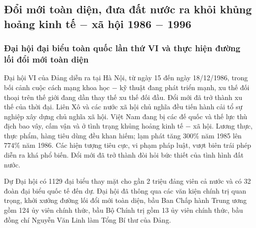 \subsection{Đổi mới toàn diện, đưa đất nước ra khỏi khủng hoảng kinh tế $-$ xã hội 1986 $-$ 1996}
\subsubsection{Đại hội đại biểu toàn quốc lần thứ VI và thực hiện đường lối đổi mới toàn diện}
Đại hội VI của Đảng diễn ra tại Hà Nội, từ ngày 15 đến ngày 18/12/1986, trong bối cảnh cuộc cách mạng khoa học $-$ kỹ thuật đang phát triển mạnh, xu thế đối thoại trên thế giới đang dần thay thế xu thế đối đầu. Đổi mới đã trở thành xu thế của thời đại. Liên Xô và các nước xã hội chủ nghĩa đều tiến hành cải tổ sự nghiệp xây dựng chủ nghĩa xã hội. Việt Nam đang bị các đế quốc và thế lực thù địch bao vây, cấm vận và ở tình trạng khủng hoảng kinh tế $-$ xã hội. Lương thực, thực phẩm, hàng tiêu dùng đều khan hiếm; lạm phát tăng $300\%$ năm 1985 lên $774\%$ năm 1986. Các hiện tượng tiêu cực, vi phạm pháp luật, vượt biên trái phép diễn ra khá phổ biến. Đổi mới đã trở thành đòi hỏi bức thiết của tình hình đất nước.

Dự Đại hội có 1129 đại biểu thay mặt cho gần 2 triệu đảng viên cả nước và có 32 đoàn đại biểu quốc tế đến dự. Đại hội đã thông qua các văn kiện chính trị quan trọng, khởi xướng đường lối đổi mới toàn diện, bầu Ban Chấp hành Trung ương gồm 124 ủy viên chính thức, bầu Bộ Chính trị gồm 13 ủy viên chính thức, bầu đồng chí Nguyễn Văn Linh làm Tổng Bí thư của Đảng.